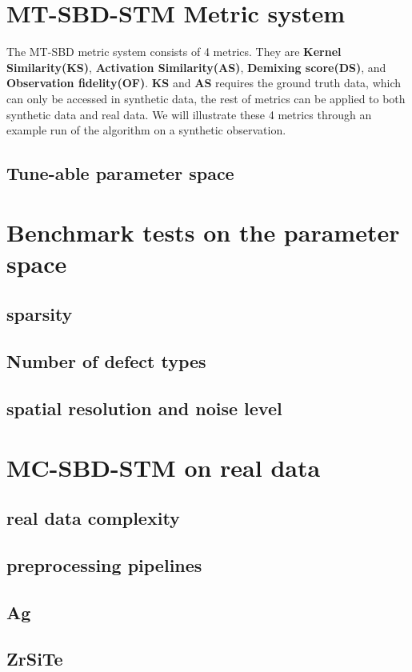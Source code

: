 \section{MT-SBD-STM Metric system}
The MT-SBD metric system consists of 4 metrics. They are \textbf{Kernel Similarity(KS)}, \textbf{Activation Similarity(AS)}, \textbf{Demixing score(DS)}, and \textbf{Observation fidelity(OF)}. \textbf{KS} and \textbf{AS} requires the ground truth data, which can only be accessed in synthetic data, the rest of metrics can be applied to both synthetic data and real data. We will illustrate these 4 metrics through an example run of the algorithm on a synthetic observation. 

\subsection{Tune-able parameter space}

\section{Benchmark tests on the parameter space}
\subsection{sparsity}
\subsection{Number of defect types}
\subsection{spatial resolution and noise level}

\section{MC-SBD-STM on real data}
\subsection{real data complexity}
\subsection{preprocessing pipelines}
\subsection{Ag}
\subsection{ZrSiTe}
